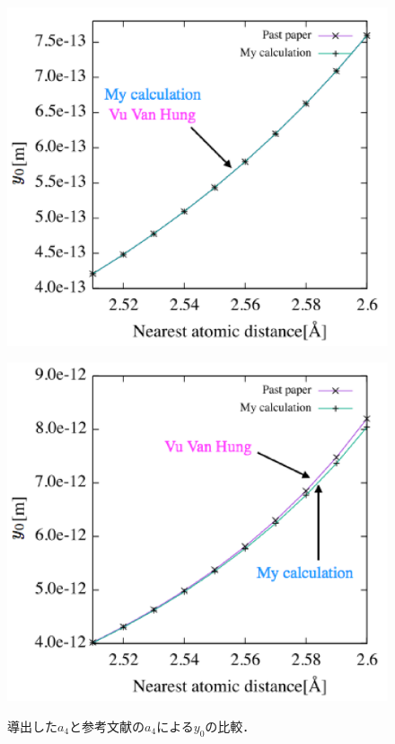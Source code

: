 \begin{figure}[htbp]
 \begin{minipage}[b]{0.5\linewidth}
  \centering
  \includegraphics[keepaspectratio, scale=0.42]
  {../image/a4_1_label.eps}
  \label{a41}
 \end{minipage}
 \begin{minipage}[b]{0.5\linewidth}
  \centering
  \includegraphics[keepaspectratio, scale=0.42]
  {../image/a4_2_label.eps}
  \label{a42}
 \end{minipage}
 \caption{導出した$a_4$と参考文献の$a_4$による$y_0$の比較．}\label{fig:vuvana4}
\end{figure}
